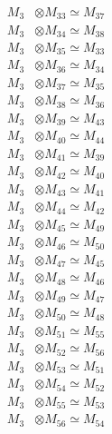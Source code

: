 \begin{align*}
M_{3} &\otimes M_{33} \simeq M_{37} \\
M_{3} &\otimes M_{34} \simeq M_{38} \\
M_{3} &\otimes M_{35} \simeq M_{33} \\
M_{3} &\otimes M_{36} \simeq M_{34} \\
M_{3} &\otimes M_{37} \simeq M_{35} \\
M_{3} &\otimes M_{38} \simeq M_{36} \\
M_{3} &\otimes M_{39} \simeq M_{43} \\
M_{3} &\otimes M_{40} \simeq M_{44} \\
M_{3} &\otimes M_{41} \simeq M_{39} \\
M_{3} &\otimes M_{42} \simeq M_{40} \\
M_{3} &\otimes M_{43} \simeq M_{41} \\
M_{3} &\otimes M_{44} \simeq M_{42} \\
M_{3} &\otimes M_{45} \simeq M_{49} \\
M_{3} &\otimes M_{46} \simeq M_{50} \\
M_{3} &\otimes M_{47} \simeq M_{45} \\
M_{3} &\otimes M_{48} \simeq M_{46} \\
M_{3} &\otimes M_{49} \simeq M_{47} \\
M_{3} &\otimes M_{50} \simeq M_{48} \\
M_{3} &\otimes M_{51} \simeq M_{55} \\
M_{3} &\otimes M_{52} \simeq M_{56} \\
M_{3} &\otimes M_{53} \simeq M_{51} \\
M_{3} &\otimes M_{54} \simeq M_{52} \\
M_{3} &\otimes M_{55} \simeq M_{53} \\
M_{3} &\otimes M_{56} \simeq M_{54} \\
\end{align*}

